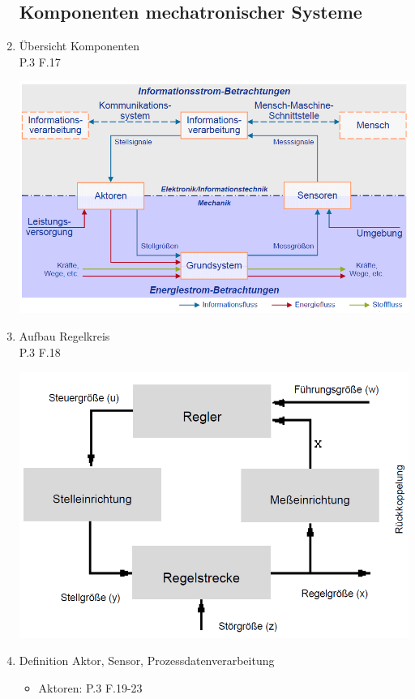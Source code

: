 \documentclass[10pt,a4paper,fleqn]{article}
\begin{document}
\begin{enumerate}
\subsection{Komponenten mechatronischer Systeme}
	\item Übersicht Komponenten\\
		P.3 F.17
		\begin{center}
			\includegraphics[scale=0.4]{komponenten.png}
		\end{center}
	\item Aufbau Regelkreis\\
		P.3 F.18\\
		\begin{center}
			\includegraphics[scale=0.5]{regelkreis.PNG}
		\end{center}
\pagebreak
	\item Definition Aktor, Sensor, Prozessdatenverarbeitung
		\begin{itemize}
		 	\item Aktoren: P.3 F.19-23\\

\end{itemize}
\end{enumerate}
\end{document}
